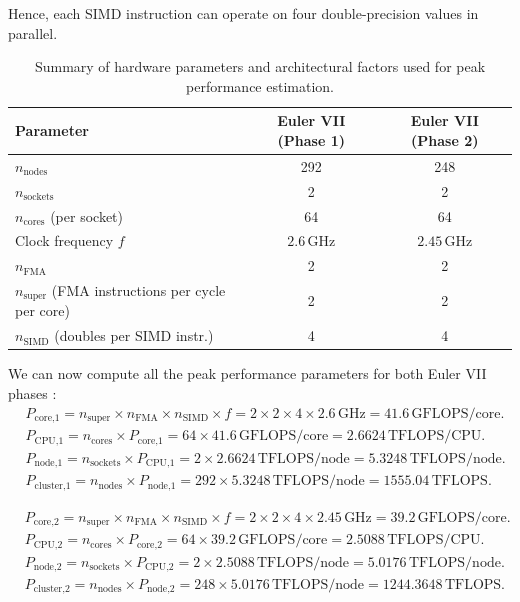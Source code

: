\documentclass[unicode,10pt,a4paper,oneside,numbers=endperiod,openany]{scrartcl}
\begin{document}
Hence, each SIMD instruction can operate on four double-precision values in parallel.

\begin{table}[h]
\centering
\begin{tabular}{lcc}
\hline
\textbf{Parameter} & \textbf{Euler VII (Phase 1)} & \textbf{Euler VII (Phase 2)} \\
\hline
$n_{\text{nodes}}$ & 292 & 248 \\
$n_{\text{sockets}}$ & 2 & 2 \\
$n_{\text{cores}}$ (per socket) & 64 & 64 \\
Clock frequency $f$ & $2.6\,\text{GHz}$ & $2.45\,\text{GHz}$ \\
$n_{\text{FMA}}$ & 2 & 2 \\
$n_{\text{super}}$ (FMA instructions per cycle per core) & 2 & 2 \\
$n_{\text{SIMD}}$ (doubles per SIMD instr.) & 4 & 4 \\
\hline
\end{tabular}
\caption{Summary of hardware parameters and architectural factors used for peak performance estimation.}
\end{table}
We can now compute all the peak performance parameters for both Euler VII phases :
\begin{align*}
&P_{\text{core,1}} =  n_{\text{super}} \times  n_{\text{FMA}} \times n_{\text{SIMD}} \times f = 2 \times 2 \times 4 \times 2.6\,\text{GHz} = 41.6\,\text{GFLOPS/core}. \\
&P_{\text{CPU,1}} = n_{\text{cores}} \times P_{\text{core,1}} = 64 \times 41.6\,\text{GFLOPS/core} = 2.6624\,\text{TFLOPS/CPU}. \\
&P_{\text{node,1}} = n_{\text{sockets}} \times P_{\text{CPU,1}} = 2 \times 2.6624\,\text{TFLOPS/node} = 5.3248\,\text{TFLOPS/node}. \\
&P_{\text{cluster,1}} = n_{\text{nodes}} \times P_{\text{node,1}} = 292 \times 5.3248\,\text{TFLOPS/node} = 1555.04\,\text{TFLOPS}.
\end{align*}


\begin{align*}
&P_{\text{core,2}} =  n_{\text{super}} \times  n_{\text{FMA}} \times n_{\text{SIMD}} \times f = 2 \times 2 \times 4 \times 2.45\,\text{GHz} = 39.2\,\text{GFLOPS/core}. \\
&P_{\text{CPU,2}} = n_{\text{cores}} \times P_{\text{core,2}} = 64 \times 39.2\,\text{GFLOPS/core} = 2.5088\,\text{TFLOPS/CPU}. \\
&P_{\text{node,2}} = n_{\text{sockets}} \times P_{\text{CPU,2}} = 2 \times 2.5088\,\text{TFLOPS/node} = 5.0176\,\text{TFLOPS/node}. \\
&P_{\text{cluster,2}} = n_{\text{nodes}} \times P_{\text{node,2}} = 248 \times 5.0176\,\text{TFLOPS/node} = 1244.3648\,\text{TFLOPS}.
\end{align*}
\end{document}
